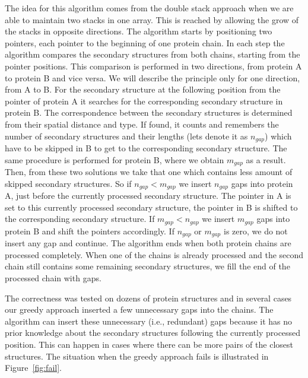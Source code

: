 \documentclass[twocolumn]{bmcart}%
\begin{document}
The idea for this algorithm comes from the double stack approach when we are able to maintain two stacks in one array.
This is reached by allowing the grow of the stacks in opposite directions.
The algorithm starts by positioning two pointers, each pointer to the beginning of one protein chain.
In each step the algorithm compares the secondary structures from both chains, starting from the pointer positions.
This comparison is performed in two directions, from protein A to protein B and vice versa.
We will describe the principle only for one direction, from A to B.
For the secondary structure at the following position from the pointer of protein A it searches for the corresponding secondary structure in protein B.
The correspondence between the secondary structures is determined from their spatial distance and type.
If found, it counts and remembers the number of secondary structures and their lengths (lets denote it as $n_{gap}$) which have to be skipped in B to get to the corresponding secondary structure.
The same procedure is performed for protein B, where we obtain $m_{gap}$ as a result.
Then, from these two solutions we take that one which contains less amount of skipped secondary structures.
So if $n_{gap} < m_{gap}$ we insert $n_{gap}$ gaps into protein A, just before the currently processed secondary structure.
The pointer in A is set to this currently processed secondary structure, the pointer in B is shifted to the corresponding secondary structure.
If $m_{gap} < n_{gap}$ we insert $m_{gap}$ gaps into protein B and shift the pointers accordingly.
If $n_{gap}$ or $m_{gap}$ is zero, we do not insert any gap and continue.
The algorithm ends when both protein chains are processed completely.
When one of the chains is already processed and the second chain still contains some remaining secondary structures, we fill the end of the processed chain with gaps.

The correctness was tested on dozens of protein structures and in several cases our greedy approach inserted a few unnecessary gaps into the chains.
The algorithm can insert these unnecessary (i.e., redundant) gaps because it has no prior knowledge about the secondary structures following the currently processed position.
This can happen in cases where there can be more pairs of the closest structures.
The situation when the greedy approach fails is illustrated in Figure~\ref{fig:fail}.
\end{document}

